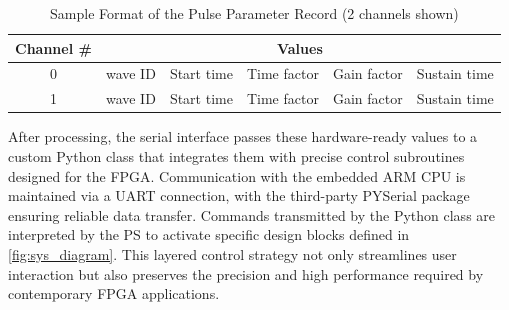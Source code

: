 \begin{table}[h]
\centering
\caption{Sample Format of the Pulse Parameter Record (2 channels shown)}
\label{table:wave_rec_table}
\begin{tabular}{|c|c|c|c|c|c|}
\hline
Channel \# & \multicolumn{5}{c|}{Values} \\
\hline
0 & wave ID & Start time & Time factor & Gain factor & Sustain time \\
\hline
1 & wave ID & Start time & Time factor & Gain factor & Sustain time \\
\hline
\end{tabular}
\end{table}

After processing, the serial interface passes these hardware-ready values to a custom Python class that integrates them with precise control subroutines designed for the FPGA. Communication with the embedded ARM CPU is maintained via a UART connection, with the third-party PYSerial package ensuring reliable data transfer. Commands transmitted by the Python class are interpreted by the PS to activate specific design blocks defined in \autoref{fig:sys_diagram}. This layered control strategy not only streamlines user interaction but also preserves the precision and high performance required by contemporary FPGA applications.